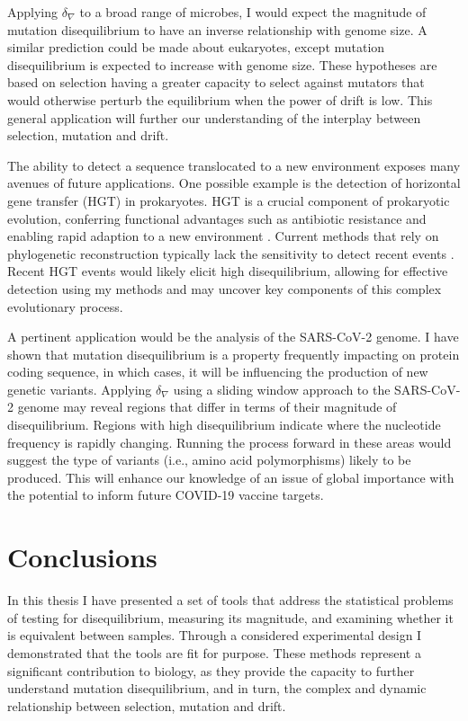 Applying $\delta_\nabla$ to a broad range of microbes, I would expect the magnitude of mutation disequilibrium to have an inverse relationship with genome size. A similar prediction could be made about eukaryotes, except mutation disequilibrium is expected to increase with genome size. These hypotheses are based on selection having a greater capacity to select against mutators that would otherwise perturb the equilibrium when the power of drift is low. This general application will further our understanding of the interplay between selection, mutation and drift. 

The ability to detect a sequence translocated to a new environment exposes many avenues of future applications. One possible example is the detection of horizontal gene transfer (HGT) in prokaryotes. HGT is a crucial component of prokaryotic evolution, conferring functional advantages such as antibiotic resistance and enabling rapid adaption to a new environment \citep{Soucy2015HorizontalLife}. Current methods that rely on phylogenetic reconstruction typically lack the sensitivity to detect recent events \citep{Li2018AStrains}. Recent HGT events would likely elicit high disequilibrium, allowing for effective detection using my methods and may uncover key components of this complex evolutionary process. 

A pertinent application would be the analysis of the SARS-CoV-2 genome. I have shown that mutation disequilibrium is a property frequently impacting on protein coding sequence, in which cases, it will be influencing the production of new genetic variants. Applying $\delta_\nabla$ using a sliding window approach to the SARS-CoV-2 genome may reveal regions that differ in terms of their magnitude of disequilibrium. Regions with high disequilibrium indicate where the nucleotide frequency is rapidly changing. Running the process forward in these areas would suggest the type of variants (i.e., amino acid polymorphisms) likely to be produced. This will enhance our knowledge of an issue of global importance with the potential to inform future COVID-19 vaccine targets. 

\section{Conclusions}

In this thesis I have presented a set of tools that address the statistical problems of testing for disequilibrium, measuring its magnitude, and examining whether it is equivalent between samples. Through a considered experimental design I demonstrated that the tools are fit for purpose. These methods represent a significant contribution to biology, as they provide the capacity to further understand mutation disequilibrium, and in turn, the complex and dynamic relationship between selection, mutation and drift. 

